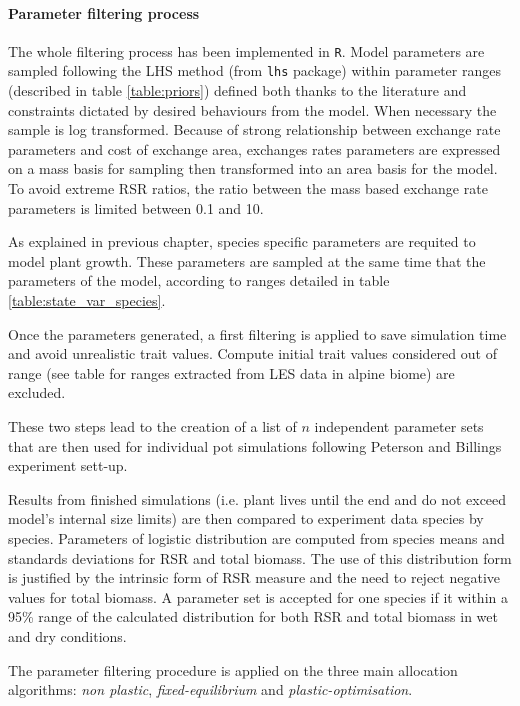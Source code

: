 \paragraph{Parameter filtering process}
The whole filtering process has been implemented in \texttt{R}. Model parameters are sampled following the LHS method (from \texttt{lhs} package) within parameter ranges (described in table \ref{table:priors}) defined both thanks to the literature and constraints dictated by desired behaviours from the model. When necessary the sample is log transformed. Because of strong relationship between exchange rate parameters and cost of exchange area, exchanges rates parameters are expressed on a mass basis for sampling then transformed into an area basis for the model. To avoid extreme RSR ratios, the ratio between the mass based exchange rate parameters is limited between 0.1 and 10.

As explained in previous chapter, species specific parameters are requited to model plant growth. These parameters are sampled at the same time that the parameters of the model, according to ranges detailed in table \ref{table:state_var_species}.

Once the parameters generated, a first filtering is applied to save simulation time and avoid unrealistic trait values. Compute initial trait values considered out of range (see table for ranges extracted from LES data \cite{wright_worldwide_2004} in alpine biome) are excluded.

These two steps lead to the creation of a list of $n$ independent parameter sets that are then used for individual pot simulations following Peterson and Billings experiment sett-up.

Results from finished simulations (i.e. plant lives until the end and do not exceed model's internal size limits) are then compared to experiment data species by species. Parameters of logistic distribution are computed from species means and standards deviations for RSR and total biomass. The use of this distribution form is justified by the intrinsic form of RSR measure and the need to reject negative values for total biomass. A parameter set is accepted for one species if it within a 95\% range of the calculated distribution for both RSR and total biomass in wet and dry conditions.

The parameter filtering procedure is applied on the three main allocation algorithms: \textit{non plastic}, \textit{fixed-equilibrium} and \textit{plastic-optimisation}.

